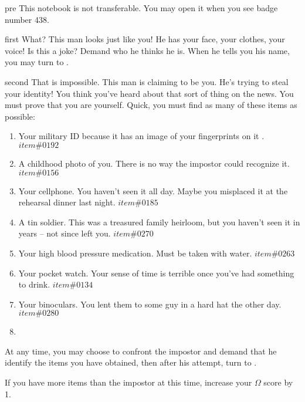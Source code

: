 \documentclass[notebook]{guildcamp1}
\begin{document}
\startnotebook{\nGroomHuntB{}}

\begin{page}{pre}
This notebook is not transferable. You may open it when you see badge number 438.
\end{page}

\begin{page}{first}
What? This man looks just like you! He has your face, your clothes, your voice! Is this a joke? Demand who he thinks he is. When he tells you his name, you may turn to .
\end{page}

\begin{page}{second}
That is impossible. This man is claiming to be you. He's trying to steal your identity! You think you've heard about that sort of thing on the news. You must prove that you are yourself. Quick, you must find as many of these items as possible:
 
 \begin{enumerate} 
\item  Your military ID because it has an image of your fingerprints on it . \(item \# 0192\)
\item  A childhood photo of you. There is no way the impostor could recognize it. \(item \# 0156\)
\item  Your cellphone. You haven't seen it all day. Maybe you misplaced it at the rehearsal dinner last night. \(item \# 0185\)
\item  A tin soldier. This was a treasured family heirloom, but you haven't seen it in years -- not since \cScientist{} left you. \(item \# 0270\)
\item  Your high blood pressure medication. Must be taken with water. \(item \# 0263\)
\item  Your pocket watch. Your sense of time is terrible once you've had something to drink. \(item \# 0134\)
\item  Your binoculars. You lent them to some guy in a hard hat the other day. \(item \# 0280\)
\item  \end{enumerate}
  
  At any time, you may choose to confront the impostor and demand that he identify the items you have obtained, then after his attempt, turn to .
  
  If you have more items than the impostor at this time, increase your $\Omega$ score by 1.
\end{page}
\end{document}
